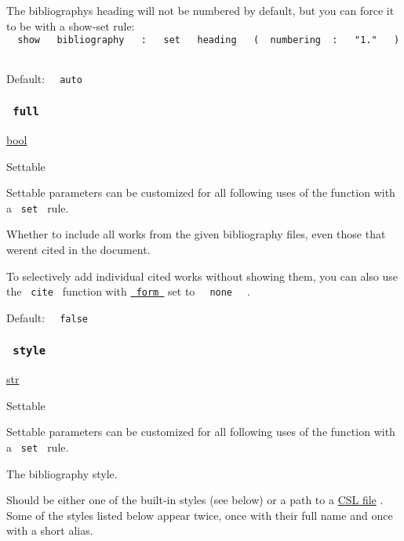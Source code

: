 The bibliography\textquotesingle s heading will not be numbered by
default, but you can force it to be with a show-set rule:
\texttt{\ }{\texttt{\ show\ }}\texttt{\ }{\texttt{\ bibliography\ }}\texttt{\ }{\texttt{\ :\ }}\texttt{\ }{\texttt{\ set\ }}\texttt{\ }{\texttt{\ heading\ }}\texttt{\ }{\texttt{\ (\ }}\texttt{\ numbering\ }{\texttt{\ :\ }}\texttt{\ }{\texttt{\ "1."\ }}\texttt{\ }{\texttt{\ )\ }}\texttt{\ }

Default: \texttt{\ }{\texttt{\ auto\ }}\texttt{\ }

\subsubsection{\texorpdfstring{\texttt{\ full\ }}{ full }}\label{parameters-full}

\href{/docs/reference/foundations/bool/}{bool}

{{ Settable }}

\label{parameters-full-settable-tooltip}
Settable parameters can be customized for all following uses of the
function with a \texttt{\ set\ } rule.

Whether to include all works from the given bibliography files, even
those that weren\textquotesingle t cited in the document.

To selectively add individual cited works without showing them, you can
also use the \texttt{\ cite\ } function with
\href{/docs/reference/model/cite/\#parameters-form}{\texttt{\ form\ }}
set to \texttt{\ }{\texttt{\ none\ }}\texttt{\ } .

Default: \texttt{\ }{\texttt{\ false\ }}\texttt{\ }

\subsubsection{\texorpdfstring{\texttt{\ style\ }}{ style }}\label{parameters-style}

\href{/docs/reference/foundations/str/}{str}

{{ Settable }}

\label{parameters-style-settable-tooltip}
Settable parameters can be customized for all following uses of the
function with a \texttt{\ set\ } rule.

The bibliography style.

Should be either one of the built-in styles (see below) or a path to a
\href{https://citationstyles.org/}{CSL file} . Some of the styles listed
below appear twice, once with their full name and once with a short
alias.

